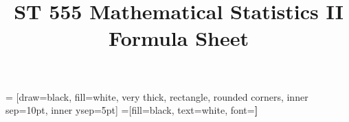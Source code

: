 \documentclass{article}
\title{ST 555 Mathematical Statistics II Formula Sheet}
\begin{document}
\begin{multicols*}{3}

 = [draw=black, fill=white, very thick,
    rectangle, rounded corners, inner sep=10pt, inner ysep=5pt]
 =[fill=black, text=white, font=\bfseries]




\end{multicols*}
\end{document}
